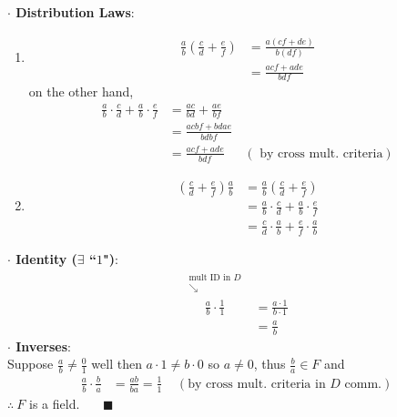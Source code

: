 \begin{theorem}
    \noindent \textbf{$\cdot$ Distribution Laws}: \\
    \begin{enumerate}
        \item \begin{align}
            \frac{a}{b}\left(\frac{c}{d}+\frac{e}{f}\right) &= \frac{a(cf+de)}{b(df)}\nonumber \\
            &= \frac{acf+ade}{bdf} \nonumber
        \end{align}
        on the other hand,
        \begin{align}
            \frac{a}{b}\cdot \frac{c}{d}+\frac{a}{b}\cdot \frac{e}{f} &= \frac{ac}{bd}+\frac{ae}{bf} \nonumber \\
            &= \frac{acbf+bdae}{bdbf} \nonumber \\
            &= \frac{acf+ade}{bdf} \ \ \ \ \ \ \ (\text{ by cross mult. criteria}) \nonumber
        \end{align}
        \item
        \begin{align}
            \left( \frac{c}{d}+\frac{e}{f} \right)\frac{a}{b} &= \frac{a}{b}\left(\frac{c}{d}+\frac{e}{f}\right) \nonumber \\
            &= \frac{a}{b}\cdot \frac{c}{d} + \frac{a}{b}\cdot \frac{e}{f} \nonumber \\
            &= \frac{c}{d}\cdot \frac{a}{b} + \frac{e}{f} \cdot \frac{a}{b} \nonumber
        \end{align}
    \end{enumerate}
    \newpage
    \noindent \textbf{$\cdot$ Identity ($\exists$ ``$1$")}: \\
    \begin{align}
        \overset{\substack{\text{mult ID in }D \\ \searrow \\}}{\frac{a}{b}\cdot \frac{1}{1}} &= \frac{a\cdot 1}{b \cdot 1} \nonumber \\
        &= \frac{a}{b} \nonumber
    \end{align}
    \noindent \textbf{$\cdot$ Inverses}: \\
    Suppose $\frac{a}{b}\neq \frac{0}{1}$ well then $a\cdot 1 \neq b\cdot 0$ so $a\neq 0$, thus
    $\frac{b}{a}\in F$ and
    \begin{align}
        \frac{a}{b}\cdot \frac{b}{a} &= \frac{ab}{ba} = \frac{1}{1} \ \ \ \ \ (\text{by cross mult. criteria in }D \text{ comm.}) \nonumber
    \end{align}
    $\therefore  \ F$ is a field. \ \ \  $\blacksquare$
\end{theorem}

